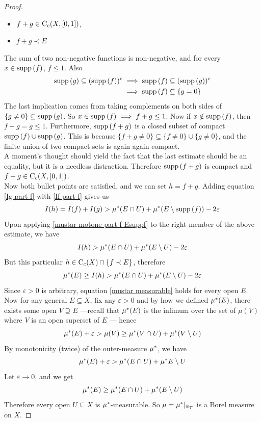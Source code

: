 \documentclass[../../main.tex]{subfiles}
\begin{document}
\begin{proof}
\begin{itemize}
    \item $f+g\in\operatorname{C}_c({X,[0,1]})$,
    \item $f+g\prec E$
\end{itemize}
The sum of two non-negative functions is non-negative, and for every $x\in\operatorname{supp}{(f)}$, $f\leq 1$. Also
\begin{align*}
    \operatorname{supp}{(g)}\subseteq (\operatorname{supp}{(f)})^c&\implies\operatorname{supp}{(f)}\subseteq (\operatorname{supp}{(g)})^c\\
    &\implies \operatorname{supp}{(f)}\subseteq \{g=0\}
\end{align*}
The last implication comes from taking complements on both sides of $\{g\neq 0\}\subseteq \operatorname{supp}{(g)}$. So $x\in\operatorname{supp}{(f)}\implies f+g\leq 1$. Now if $x\notin\operatorname{supp}{(f)}$, then $f+g=g\leq 1$. Furthermore, $\operatorname{supp}{(f+g)}$ is a closed subset of compact $\operatorname{supp}{(f)}\cup\operatorname{supp}{(g)}$. This is because $\{f+g\neq 0\}\subseteq \{f\neq 0\}\cup\{g\neq 0\}$, and the finite union of two compact sets is again again compact.\\

A moment's thought should yield the fact that the last estimate should be an equality, but it is a needless distraction. Therefore $\operatorname{supp}{(f+g)}$ is compact and $f+g\in\operatorname{C}_c({X,[0,1]})$.\\

Now both bullet points are satisfied, and we can set $h=f+g$. Adding equation \eqref{Ig part f} with \eqref{If part f} gives us
\[
I(h) = I(f) + I(g) > \mu^*(E\cap U)+\mu^*(E\setminus \operatorname{supp}{(f)})-2\varepsilon
\]
Upon applying \eqref{mustar motone part f Esuppf} to the right member of the above estimate, we have
\[
I(h)>\mu^*(E\cap U)+\mu^*(E\setminus U)-2\varepsilon
\]
But this particular $h\in\operatorname{C}_c({X})\cap\{f\prec E\}$, therefore
\[
\mu^*(E)\geq I(h)>\mu^*(E\cap U)+\mu^*(E\setminus U)-2\varepsilon
\]
Since $\varepsilon>0$ is arbitrary, equation \eqref{mustar measurable} holds for every open $E$. Now for any general $E\subseteq X$, fix any $\varepsilon>0$ and by how we defined $\mu^*(E)$, there exists some open $V\supseteq E$ —recall that $\mu^*(E)$ is the infimum over the set of $\mu(V)$ where $V$ is an open superset of $E$ — hence
\[
\mu^*(E)+\varepsilon>\mu(V)\geq\mu^*(V\cap U) + \mu^*(V\setminus U)
\]
By monotonicity (twice) of the outer-measure $\mu^*$, we have
\[
\mu^*(E)+\varepsilon>\mu^*(E\cap U) + \mu^*{E\setminus U}
\]
Let $\varepsilon\to 0$, and we get
\[
\mu^*(E)\geq \mu^*(E\cap U) + \mu^*(E\setminus U)
\]
Therefore every open $U\subseteq X$ is $\mu^*$-measurable. So $\mu = \mu^*|_{\mathbb{B}_{\mathcal{T}}}$ is a Borel measure on $X$.
\end{proof}
\end{document}
